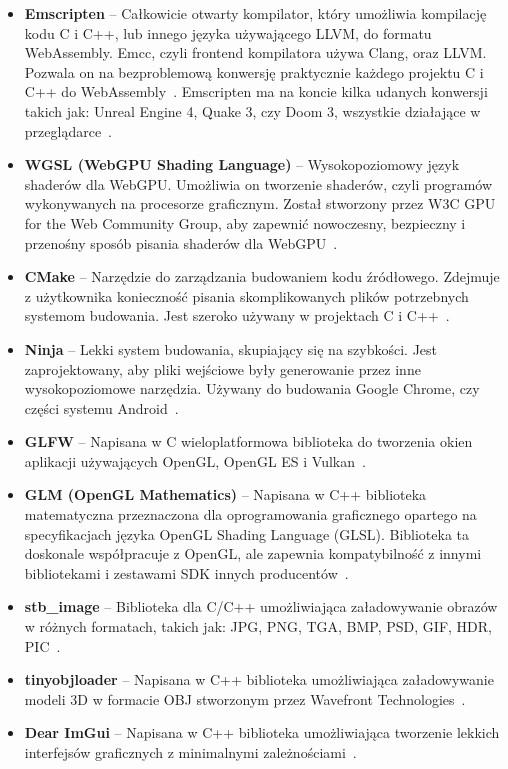 \begin{itemize}
  \item \textbf{Emscripten} -- Całkowicie otwarty kompilator, który umożliwia kompilację kodu C i C++, lub innego języka używającego LLVM, do formatu WebAssembly. Emcc, czyli frontend kompilatora używa Clang, oraz LLVM. Pozwala on na bezproblemową konwersję praktycznie każdego projektu C i C++ do WebAssembly~\cite{Emscripten}. Emscripten ma na koncie kilka udanych konwersji takich jak: Unreal Engine 4, Quake 3, czy Doom 3, wszystkie działające w przeglądarce~\cite{emscripten-examples}.
  \item \textbf{WGSL (WebGPU Shading Language)} -- Wysokopoziomowy język shaderów dla WebGPU. Umożliwia on tworzenie shaderów, czyli programów wykonywanych na procesorze graficznym. Został stworzony przez W3C GPU for the Web Community Group, aby zapewnić nowoczesny, bezpieczny i przenośny sposób pisania shaderów dla WebGPU~\cite{WGSL-draft}.
  \item \textbf{CMake} -- Narzędzie do zarządzania budowaniem kodu źródłowego. Zdejmuje z użytkownika konieczność pisania skomplikowanych plików potrzebnych systemom budowania. Jest szeroko używany w projektach C i C++~\cite{CMake}.
  \item \textbf{Ninja} -- Lekki system budowania, skupiający się na szybkości. Jest zaprojektowany, aby pliki wejściowe były generowanie przez inne wysokopoziomowe narzędzia. Używany do budowania Google Chrome, czy części systemu Android~\cite{Ninja}.
  \item \textbf{GLFW} -- Napisana w C wieloplatformowa biblioteka do tworzenia okien aplikacji używających OpenGL, OpenGL ES i Vulkan~\cite{GLFW}.
  \item \textbf{GLM (OpenGL Mathematics)} -- Napisana w C++ biblioteka matematyczna przeznaczona dla oprogramowania graficznego opartego na specyfikacjach języka OpenGL Shading Language (GLSL). Biblioteka ta doskonale współpracuje z OpenGL, ale zapewnia kompatybilność z innymi bibliotekami i zestawami SDK innych producentów~\cite{GLM}.
  \item \textbf{stb\_image} -- Biblioteka dla C/C++ umożliwiająca załadowywanie obrazów w różnych formatach, takich jak: JPG, PNG, TGA, BMP, PSD, GIF, HDR, PIC~\cite{stb_image}.
  \item \textbf{tinyobjloader} -- Napisana w C++ biblioteka umożliwiająca załadowywanie modeli 3D w formacie OBJ stworzonym przez Wavefront Technologies~\cite{tinyobjloader}.
  \item \textbf{Dear ImGui} -- Napisana w C++ biblioteka umożliwiająca tworzenie lekkich interfejsów graficznych z minimalnymi zależnościami~\cite{Dear-ImGui}.
\end{itemize}

